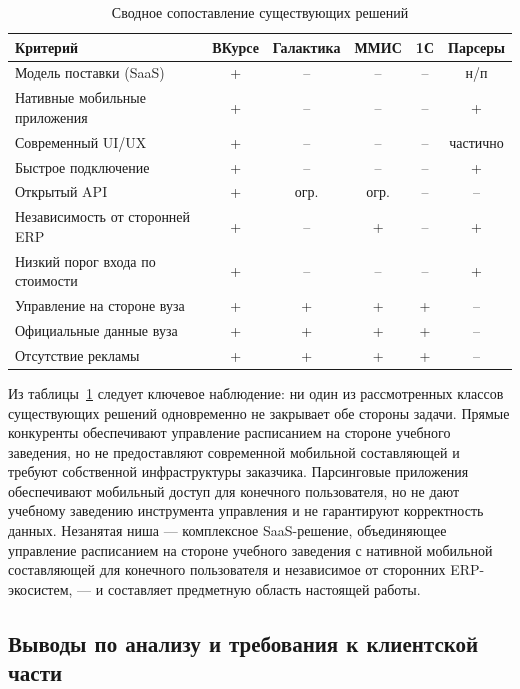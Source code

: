 \begin{table}[h]
  \caption{Сводное сопоставление существующих решений}
  \label{tab:competitors-summary}
  \centering
  \small
  \begin{tabular}{p{} c c c c c}
    \toprule
    Критерий & ВКурсе & Галактика & ММИС & 1С & Парсеры \\
    \midrule
    Модель поставки (SaaS)         & + & -- & -- & -- & н/п \\
    Нативные мобильные приложения  & + & -- & -- & -- & + \\
    Современный UI/UX              & + & -- & -- & -- & частично \\
    Быстрое подключение            & + & -- & -- & -- & + \\
    Открытый API                   & + & огр. & огр. & -- & -- \\
    Независимость от сторонней ERP & + & -- & + & -- & + \\
    Низкий порог входа по стоимости& + & -- & -- & -- & + \\
    Управление на стороне вуза     & + & + & + & + & -- \\
    Официальные данные вуза        & + & + & + & + & -- \\
    Отсутствие рекламы             & + & + & + & + & -- \\
    \bottomrule
  \end{tabular}
\end{table}

Из таблицы~\ref{tab:competitors-summary} следует ключевое наблюдение: ни один из рассмотренных классов существующих решений одновременно не закрывает обе стороны задачи. Прямые конкуренты обеспечивают управление расписанием на стороне учебного заведения, но не предоставляют современной мобильной составляющей и требуют собственной инфраструктуры заказчика. Парсинговые приложения обеспечивают мобильный доступ для конечного пользователя, но не дают учебному заведению инструмента управления и не гарантируют корректность данных. Незанятая ниша --- комплексное SaaS-решение, объединяющее управление расписанием на стороне учебного заведения с нативной мобильной составляющей для конечного пользователя и независимое от сторонних ERP-экосистем, --- и составляет предметную область настоящей работы.

\subsection{Выводы по анализу и требования к клиентской части}

